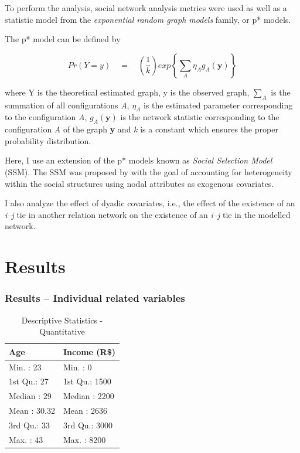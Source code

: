 \documentclass[compress]{beamer}
\begin{document}
\begin{frame}
	\justify
	
	To perform the analysis, social network analysis metrics were used as well as a statistic model from the \textit{exponential random graph models} family, or p* models.
	
	\vspace{3mm}
	
	The p* model can be defined by
	
	\begin{equation}
	Pr(Y=y) \quad = \quad \left(\frac{1}{k}\right) exp \left\{ \sum_{A} \eta_A g_A (\textbf{y}) \right\}
	\end{equation}
	
	where Y is the theoretical estimated graph, y is the observed graph, $\sum_{A}$ is the summation of all configurations \textit{A},  $\eta_A$ is the estimated parameter corresponding to the configuration \textit{A}, $g_A(\textbf{y})$ is the network statistic corresponding to the configuration \textit{A} of the graph \textbf{y} and \textit{k} is a constant which ensures the proper probability distribution.
\end{frame}


\begin{frame}
\justify

Here, I use an extension of the p* models known as \textit{Social Selection Model} (SSM). The SSM was proposed by  with the goal of accounting for heterogeneity within the social structures using nodal attributes as exogenous covariates.

I also analyze the effect of dyadic covariates, i.e., the effect of the existence of an \textit{i--j} tie in another relation network on the existence of an \textit{i--j} tie in the modelled network.
\end{frame}

\section{Results}
\begin{frame}
	\frametitle{Results -- Individual related variables}
	
	\begin{table}[ht]
			\centering
			\caption{Descriptive Statistics - Quantitative}
			\label{quanti}
		
		\begin{tabular}{p{4cm}p{4cm}}
				\hline
				Age & Income (R\$) \\ 
				\hline
				Min.   : 23   & Min.   :   0   \\ 
				1st Qu.: 27   & 1st Qu.: 1500   \\ 
				Median : 29   & Median : 2200   \\ 
				Mean   : 30.32 & Mean   : 2636   \\ 
				3rd Qu.: 33   & 3rd Qu.: 3000   \\ 
				Max.   : 43   & Max.   : 8200   \\ 
				\hline
			\end{tabular}
		
	\end{table}
\end{frame}
\end{document}
